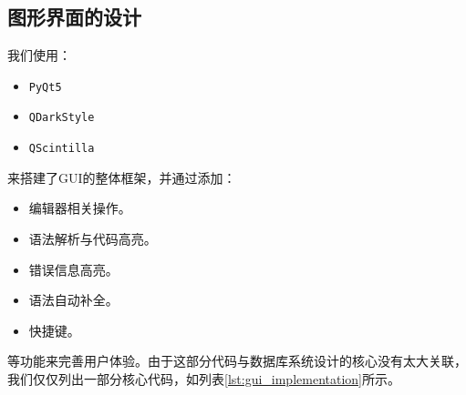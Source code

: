 \documentclass[UTF8]{ctexrep} %
\begin{document}
\subsection{图形界面的设计}
我们使用：
\begin{itemize}
    \item \texttt{PyQt5}
    \item \texttt{QDarkStyle}
    \item \texttt{QScintilla}
\end{itemize}
来搭建了GUI的整体框架，并通过添加：
\begin{itemize}
    \item 编辑器相关操作。
    \item 语法解析与代码高亮。
    \item 错误信息高亮。
    \item 语法自动补全。
    \item 快捷键。
\end{itemize}
等功能来完善用户体验。由于这部分代码与数据库系统设计的核心没有太大关联，我们仅仅列出一部分核心代码，如列表\ref{lst:gui_implementation}所示。
\end{document}
